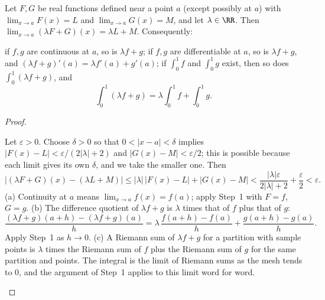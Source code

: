 \documentclass[10pt]{scrartcl}
\begin{document}
\begin{proposition*}
  Let $F,G$ be real functions defined near a point $a$ (except possibly at $a$) with $\lim_{x\to a}F(x)=L$ and $\lim_{x\to a}G(x)=M$, and let $\lambda\in\RR$. Then $\lim_{x\to a}(\lambda F+G)(x)=\lambda L+M$. Consequently:
  \begin{enumerate}[(a)]
    \ii if $f,g$ are continuous at $a$, so is $\lambda f+g$;
    \ii if $f,g$ are differentiable at $a$, so is $\lambda f+g$, and $(\lambda f+g)'(a)=\lambda f'(a)+g'(a)$;
    \ii if $\int_0^1f$ and $\int_0^1g$ exist, then so does $\int_0^1(\lambda f+g)$, and
    \[
      \int_0^1(\lambda f+g)=\lambda\int_0^1f+\int_0^1g .
    \]
  \end{enumerate}
\end{proposition*}
\begin{proof}
  \begin{steps}
    \ii Let $\varepsilon>0$. Choose $\delta>0$ so that $0<|x-a|<\delta$ implies $|F(x)-L|<\varepsilon/(2|\lambda|+2)$ and $|G(x)-M|<\varepsilon/2$; this is possible because each limit gives its own $\delta$, and we take the smaller one. Then
    \[
      |(\lambda F+G)(x)-(\lambda L+M)|\le|\lambda|\,|F(x)-L|+|G(x)-M|<\frac{|\lambda|\varepsilon}{2|\lambda|+2}+\frac\varepsilon2<\varepsilon .
    \]
    \ii (a) Continuity at $a$ means $\lim_{x\to a}f(x)=f(a)$; apply Step~1 with $F=f$, $G=g$.
    \ii (b) The difference quotient of $\lambda f+g$ is $\lambda$ times that of $f$ plus that of $g$:
    \[
      \frac{(\lambda f+g)(a+h)-(\lambda f+g)(a)}{h}=\lambda\,\frac{f(a+h)-f(a)}{h}+\frac{g(a+h)-g(a)}{h}.
    \]
    Apply Step~1 as $h\to0$.
    \ii (c) A Riemann sum of $\lambda f+g$ for a partition with sample points is $\lambda$ times the Riemann sum of $f$ plus the Riemann sum of $g$ for the same partition and points. The integral is the limit of Riemann sums as the mesh tends to $0$, and the argument of Step~1 applies to this limit word for word.
  \end{steps}
\end{proof}
\end{document}

